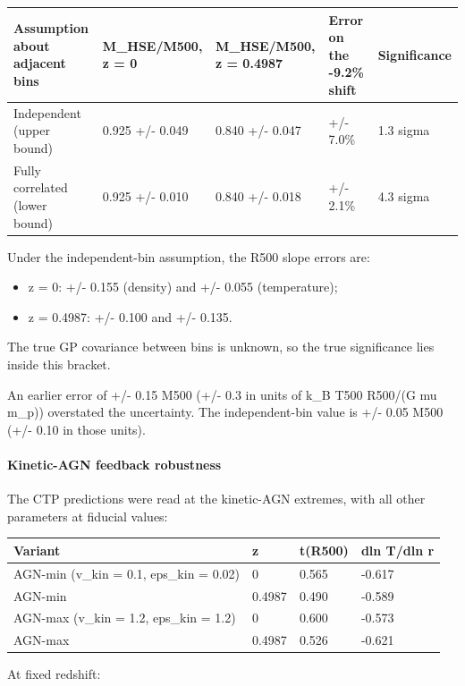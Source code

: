 \documentclass[11pt,a4paper]{article}
\begin{document}
\begin{longtable}{@{}p{}p{}p{}p{}p{}@{}}
\toprule
\textbf{Assumption about adjacent bins} & \textbf{M\_HSE/M500, z = 0} & \textbf{M\_HSE/M500, z = 0.4987} & \textbf{Error on the -9.2\% shift} & \textbf{Significance} \\ \midrule \endhead
Independent (upper bound) & 0.925 +/- 0.049 & 0.840 +/- 0.047 & +/- 7.0\% & 1.3 sigma \\
Fully correlated (lower bound) & 0.925 +/- 0.010 & 0.840 +/- 0.018 & +/- 2.1\% & 4.3 sigma \\
\bottomrule\end{longtable}
Under the independent-bin assumption, the R500 slope errors are:

\begin{itemize}
  \item z = 0: +/- 0.155 (density) and +/- 0.055 (temperature);
  \item z = 0.4987: +/- 0.100 and +/- 0.135.
\end{itemize}
The true GP covariance between bins is unknown, so the true significance lies inside this bracket.

An earlier error of +/- 0.15 M500 (+/- 0.3 in units of k\_B T500 R500/(G mu m\_p)) overstated the uncertainty. The independent-bin value is +/- 0.05 M500 (+/- 0.10 in those units).

\paragraph{Kinetic-AGN feedback robustness}
The CTP predictions were read at the kinetic-AGN extremes, with all other parameters at fiducial values:

\begin{longtable}{@{}p{}p{}p{}p{}@{}}
\toprule
\textbf{Variant} & \textbf{z} & \textbf{t(R500)} & \textbf{dln T/dln r} \\ \midrule \endhead
AGN-min (v\_kin = 0.1, eps\_kin = 0.02) & 0 & 0.565 & -0.617 \\
AGN-min & 0.4987 & 0.490 & -0.589 \\
AGN-max (v\_kin = 1.2, eps\_kin = 1.2) & 0 & 0.600 & -0.573 \\
AGN-max & 0.4987 & 0.526 & -0.621 \\
\bottomrule\end{longtable}
At fixed redshift:
\end{document}
